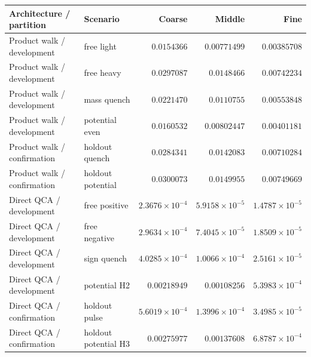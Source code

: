 \begin{tabular}{@{}llrrr@{}}
\toprule
Architecture / partition & Scenario & Coarse & Middle & Fine \\
\midrule
Product walk / development & free light & $0.0154366$ & $0.00771499$ & $0.00385708$ \\
Product walk / development & free heavy & $0.0297087$ & $0.0148466$ & $0.00742234$ \\
Product walk / development & mass quench & $0.0221470$ & $0.0110755$ & $0.00553848$ \\
Product walk / development & potential even & $0.0160532$ & $0.00802447$ & $0.00401181$ \\
Product walk / confirmation & holdout quench & $0.0284341$ & $0.0142083$ & $0.00710284$ \\
Product walk / confirmation & holdout potential & $0.0300073$ & $0.0149955$ & $0.00749669$ \\
Direct QCA / development & free positive & $2.3676\times 10^{-4}$ & $5.9158\times 10^{-5}$ & $1.4787\times 10^{-5}$ \\
Direct QCA / development & free negative & $2.9634\times 10^{-4}$ & $7.4045\times 10^{-5}$ & $1.8509\times 10^{-5}$ \\
Direct QCA / development & sign quench & $4.0285\times 10^{-4}$ & $1.0066\times 10^{-4}$ & $2.5161\times 10^{-5}$ \\
Direct QCA / development & potential H2 & $0.00218949$ & $0.00108256$ & $5.3983\times 10^{-4}$ \\
Direct QCA / confirmation & holdout pulse & $5.6019\times 10^{-4}$ & $1.3996\times 10^{-4}$ & $3.4985\times 10^{-5}$ \\
Direct QCA / confirmation & holdout potential H3 & $0.00275977$ & $0.00137608$ & $6.8787\times 10^{-4}$ \\
\bottomrule
\end{tabular}
